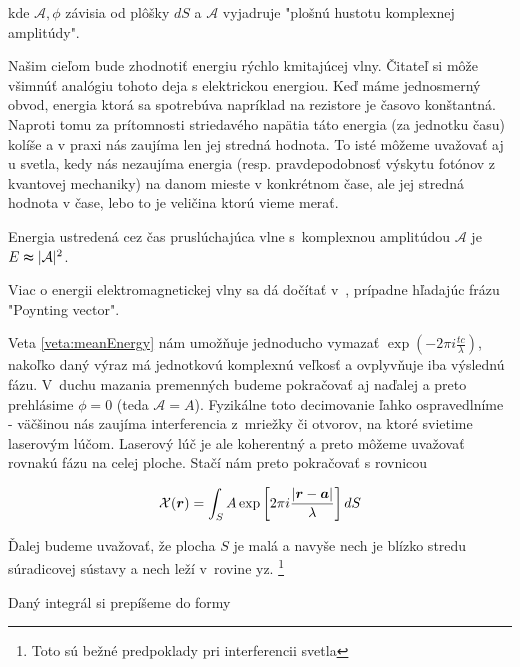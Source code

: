 kde $\mathcal{A}, \phi$ závisia od plôšky $dS$ a $\mathcal{A}$
vyjadruje "plošnú hustotu komplexnej amplitúdy".

\begin{poznamka}
 Našim cieľom bude zhodnotiť energiu rýchlo kmitajúcej vlny.
 Čitateľ si môže všimnúť analógiu tohoto deja s elektrickou
 energiou. Keď máme jednosmerný obvod, energia ktorá sa spotrebúva
 napríklad na rezistore je časovo konštantná. Naproti tomu za
 prítomnosti striedavého napätia táto energia (za jednotku času) kolíše
 a v praxi nás zaujíma len jej stredná hodnota. To isté môžeme
 uvažovať aj u svetla, kedy nás nezaujíma energia (resp.
 pravdepodobnosť výskytu fotónov z kvantovej mechaniky) 
 na danom mieste v konkrétnom čase,
 ale jej stredná hodnota v čase, lebo to je veličina ktorú vieme merať.
\end{poznamka}


\begin{veta}
Energia ustredená cez čas pruslúchajúca vlne s~komplexnou amplitúdou 
$\mathcal{A}$ je $E \thickapprox |\mathcal{A}|^2$.
\label{veta:meanEnergy}
\end{veta}

\begin{poznamka}
 Viac o energii elektromagnetickej vlny sa dá dočítať 
 v~\cite[str. 90-92]{eldyn}, prípadne hľadajúc frázu "Poynting vector".
\end{poznamka}

Veta \ref{veta:meanEnergy} nám umožňuje jednoducho vymazať
$\exp\left(-2 \pi i \frac{tc}{\lambda}\right)$, nakoľko daný výraz má
jednotkovú komplexnú veľkosť a ovplyvňuje iba výslednú fázu.
V~duchu mazania premenných budeme pokračovať aj
naďalej a preto prehlásime $\phi=0$ (teda $\mathcal{A}=A$).
Fyzikálne toto decimovanie
ľahko ospravedlníme - väčšinou nás zaujíma interferencia
z~mriežky či otvorov, na ktoré svietime laserovým lúčom. Laserový
lúč je ale koherentný a preto môžeme uvažovať rovnakú fázu na celej
ploche. Stačí nám preto pokračovať s rovnicou

\begin{equation}
\mathcal{X}(\boldsymbol{r})=\int_S
 A \exp \left[2 \pi i \frac{|\boldsymbol{r}-\boldsymbol{a}|}{\lambda} \right] dS
\end{equation}

Ďalej budeme uvažovať, že plocha $S$ je malá a navyše nech je
blízko stredu súradicovej sústavy a nech leží v~rovine yz.
\footnote{Toto sú bežné predpoklady pri interferencii svetla}

Daný integrál si prepíšeme do formy

